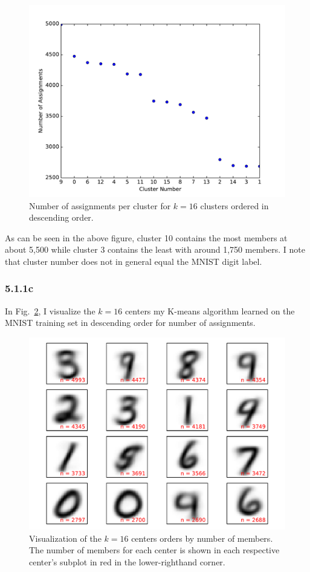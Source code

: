 \documentclass[12pt]{amsart}
\begin{document}
\begin{figure}[H]
	\includegraphics[width=\columnwidth]{k_16_num_assignments.pdf}
    \caption{Number of assignments per cluster for $k = 16$ clusters ordered in descending order.}
    \label{fig:k_16_num_assignments}
\end{figure}

As can be seen in the above figure, cluster 10 contains the most members at about 5,500 while cluster 3 contains the least with around 1,750 members.  I note that cluster number does not in general equal the MNIST digit label.

\subsubsection*{5.1.1c}

In Fig.~\ref{fig:k_16_means}, I visualize the $k = 16$ centers my K-means algorithm learned on the MNIST training set in descending order for number of assignments.

\begin{figure}[H]
	\includegraphics[width=\columnwidth]{k_16_means.pdf}
    \caption{Visualization of the $k = 16$ centers orders by number of members.  The number of members for each center is shown in each respective center's subplot in red in the lower-righthand corner.}
    \label{fig:k_16_means}
\end{figure}
\end{document}
